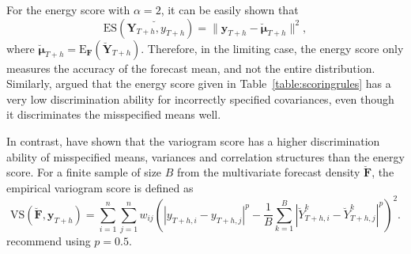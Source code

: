 \documentclass[a4paper, 11pt]{article}
\def\E{\text{E}}
\begin{document}
For the energy score with $\alpha=2$, it can be easily shown that
\begin{equation} \label{eq:(5.1)}
\text{ES}(\breve{\bm{Y}_{T+h},y_{T+h}}) = \|\bm{y}_{T+h}-\breve{\bm{\mu}}_{T+h}\|^2,
\end{equation}
where $\breve{\bm{\mu}}_{T+h} =\E_{\bm{F}}(\breve{\bm{Y}}_{T+h}) $. Therefore, in the limiting case, the energy score only measures the accuracy of the forecast mean, and not the entire distribution. Similarly, \citet{Pinson2013a} argued that the energy score given in Table~\ref{table:scoringrules} has a very low discrimination ability for incorrectly specified covariances, even though it discriminates the misspecified means well.

In contrast, \citet{SCHEUERER2015} have shown that the variogram score has a higher discrimination ability of misspecified means, variances and correlation structures than the energy score. For a finite sample of size $B$ from the multivariate forecast density $\breve{\bm{F}}$, the empirical variogram score is defined as
\begin{equation}
\text{VS}(\breve{\bm{F}}, \bm{y}_{T+h}) = \displaystyle\sum_{i=1}^{n}\displaystyle\sum_{j=1}^{n}w_{ij}\left(|y_{T+h,i} - y_{T+h,j}|^p - \frac{1}{B} \displaystyle\sum_{k=1}^{B} |\breve{Y}^k_{T+h,i}-\breve{Y}^k_{T+h,j}|^p\right)^2.
\end{equation}
\citet{SCHEUERER2015} recommend using $p=0.5$. 



%
\end{document}
